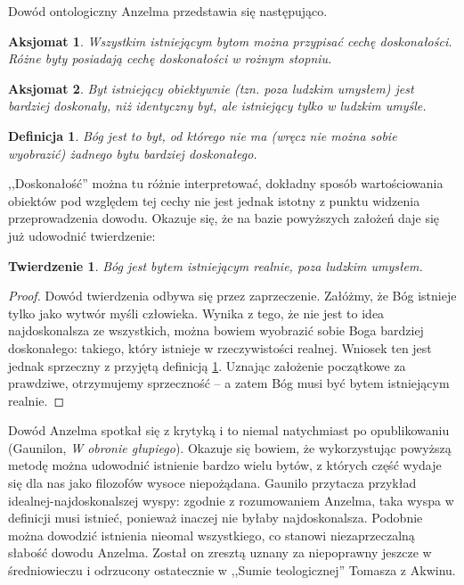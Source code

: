\documentclass{eiti-raport}
\newtheorem{theorem}{Twierdzenie}
\newtheorem{definition}{Definicja}
\newtheorem{axiom}{Aksjomat}
\begin{document}
Dowód ontologiczny Anzelma przedstawia się następująco. 
\begin{axiom} \label{axiom:1}
	Wszystkim istniejącym bytom można przypisać cechę \emph{doskonałości}. Różne byty posiadają cechę doskonałości w rożnym stopniu. 
\end{axiom}
\begin{axiom} \label{axiom:2}
	Byt istniejący obiektywnie (tzn. poza ludzkim umysłem) jest bardziej doskonały, niż identyczny byt, ale istniejący tylko w ludzkim umyśle. 
\end{axiom}
\begin{definition} \label{def:anzelm-god}
	Bóg jest to byt, od którego nie ma (wręcz nie można sobie wyobrazić) żadnego bytu bardziej doskonałego. 
\end{definition}
\noindent,,Doskonałość'' można tu różnie interpretować, dokładny sposób wartościowania obiektów pod względem tej cechy nie jest jednak istotny z punktu widzenia przeprowadzenia dowodu. Okazuje się, że na bazie powyższych założeń daje się już udowodnić twierdzenie:
\begin{theorem} \label{theorem:anzelm-god}
	Bóg jest bytem istniejącym realnie, poza ludzkim umysłem. 
\end{theorem}
\begin{proof}
	Dowód twierdzenia odbywa się przez zaprzeczenie. Załóżmy, że Bóg istnieje tylko jako wytwór myśli człowieka. Wynika z tego, że nie jest to idea najdoskonalsza ze wszystkich, można bowiem wyobrazić sobie Boga bardziej doskonałego: takiego, który istnieje w rzeczywistości realnej. Wniosek ten jest jednak sprzeczny z przyjętą definicją \ref{def:anzelm-god}. Uznając założenie początkowe za prawdziwe, otrzymujemy sprzeczność -- a zatem Bóg musi być bytem istniejącym realnie. 
\end{proof}
Dowód Anzelma spotkał się z krytyką i to niemal natychmiast po opublikowaniu (Gaunilon, \textit{W obronie głupiego}). Okazuje się bowiem, że wykorzystując powyższą metodę można udowodnić istnienie bardzo wielu bytów, z których część wydaje się dla nas jako filozofów wysoce niepożądana. Gaunilo przytacza przykład idealnej-najdoskonalszej wyspy: zgodnie z rozumowaniem Anzelma, taka wyspa w definicji musi istnieć, ponieważ inaczej nie byłaby najdoskonalsza. Podobnie można dowodzić istnienia nieomal wszystkiego, co stanowi niezaprzeczalną słabość dowodu Anzelma. Został on zresztą uznany za niepoprawny jeszcze w średniowieczu i odrzucony ostatecznie w ,,Sumie teologicznej'' Tomasza z Akwinu. 
\end{document}
